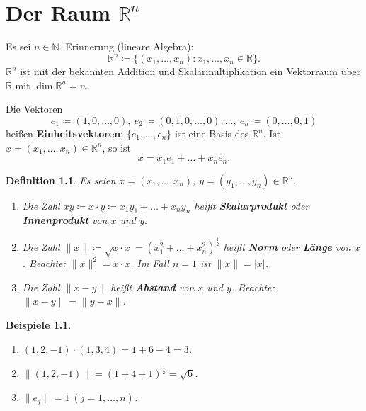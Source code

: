\documentclass[12pt]{extreport} %
\newcommand{\N}{\mathbb{N}}
\newcommand{\R}{\mathbb{R}}
\theoremstyle{named}
\theoremstyle{itshape}
\newtheorem*{definition}{Definition}
\theoremstyle{normal}
\newtheorem*{beispiele}{Beispiele}
\begin{document}
{\chapter{\texorpdfstring{Der Raum $\R^{n}$}{Der Raum Rn}}
Es sei $n \in \N$. Erinnerung (lineare Algebra):
$$\R^{n} \coloneqq \{ (x_{1}, \dotsc, x_{n}) : x_{1}, \dotsc, x_{n} \in \R \}.$$
$\R^{n}$ ist mit der bekannten Addition und Skalarmultiplikation ein Vektorraum über $\R$ mit $\dim \R^{n} = n$.

Die Vektoren 
$$e_{1} \coloneqq (1, 0, \dotsc, 0), ~ e_{2} \coloneqq (0, 1, 0, \dotsc, 0), \dotsc, ~ e_{n} \coloneqq (0, \dotsc, 0, 1)$$
hei{\ss}en \textbf{Einheitsvektoren};
$\{ e_{1}, \dotsc, e_{n} \}$ ist eine Basis des $\R^{n}$. Ist $x = (x_{1}, \dotsc, x_{n}) \in \R^{n}$, so ist
$$ x = x_{1} e_{1} + \dotsc + x_{n} e_{n}. $$

   
\begin{definition}
	Es seien $x = (x_{1}, \dotsc, x_{n})$, $y = (y_{1}, \dotsc, y_{n}) \in \R^{n}$.
	\begin{enumerate}
		\item Die Zahl $xy \coloneqq x \cdot y \coloneqq x_{1} y_{1} + \dotsc + x_{n} y_{n}$ hei{\ss}t \textbf{Skalarprodukt} oder \textbf{Innenprodukt} von $x$ und $y$. 
		\item Die Zahl $\| x \| \coloneqq \sqrt{x \cdot x} = (x_{1}^{2} + \dotsc + x_{n}^{2})^{\frac{1}{2}}$ hei{\ss}t \textbf{Norm} oder \textbf{Länge} von $x$. 
		Beachte: $\|x\|^{2} = x \cdot x$. Im Fall $n = 1$ ist $\|x\| = |x|$.
		\item Die Zahl $\| x - y \|$ hei{\ss}t \textbf{Abstand} von $x$ und $y$. Beachte: $\| x - y \| = \| y - x \|$.
	\end{enumerate}
\end{definition}


\begin{beispiele} ~\
	\begin{enumerate}
		\item $(1, 2, -1) \cdot (1, 3, 4) = 1 + 6 - 4 = 3$.
		\item $\| (1, 2, -1) \| = (1 + 4 + 1)^{\frac{1}{2}} = \sqrt{6}$.
		\item $\| e_{j} \| = 1 ~(j = 1, \dotsc, n)$.
	\end{enumerate}
\end{beispiele}

}
\end{document}
